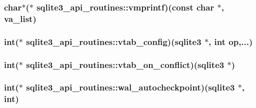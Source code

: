 \hypertarget{structsqlite3__api__routines_a9de374e1a95d8b049dae5c5833fd93f0}{
\subsubsection[{vmprintf}]{\setlength{\rightskip}{0pt plus 5cm}char$\ast$($\ast$ sqlite3\-\_\-api\-\_\-routines\-::vmprintf)(const char $\ast$, va\-\_\-list)}}\label{structsqlite3__api__routines_a9de374e1a95d8b049dae5c5833fd93f0}
\hypertarget{structsqlite3__api__routines_a9670fe7124c3bd00b32354933c15313f}{
\subsubsection[{vtab\-\_\-config}]{\setlength{\rightskip}{0pt plus 5cm}int($\ast$ sqlite3\-\_\-api\-\_\-routines\-::vtab\-\_\-config)({\bf sqlite3} $\ast$, int op,...)}}\label{structsqlite3__api__routines_a9670fe7124c3bd00b32354933c15313f}
\hypertarget{structsqlite3__api__routines_ae153b85e12e894c0bfb433c13c2690d7}{
\subsubsection[{vtab\-\_\-on\-\_\-conflict}]{\setlength{\rightskip}{0pt plus 5cm}int($\ast$ sqlite3\-\_\-api\-\_\-routines\-::vtab\-\_\-on\-\_\-conflict)({\bf sqlite3} $\ast$)}}\label{structsqlite3__api__routines_ae153b85e12e894c0bfb433c13c2690d7}
\hypertarget{structsqlite3__api__routines_a6f9743cc31d029be8a765529bc693552}{
\subsubsection[{wal\-\_\-autocheckpoint}]{\setlength{\rightskip}{0pt plus 5cm}int($\ast$ sqlite3\-\_\-api\-\_\-routines\-::wal\-\_\-autocheckpoint)({\bf sqlite3} $\ast$, int)}}\label{structsqlite3__api__routines_a6f9743cc31d029be8a765529bc693552}
